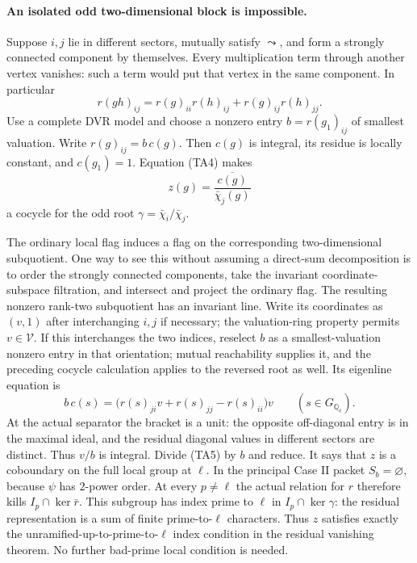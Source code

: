 \paragraph{An isolated odd two-dimensional block is impossible.}
Suppose \(i,j\) lie in different sectors, mutually satisfy
\(\leadsto\), and form a strongly connected component by
themselves. Every multiplication term through another vertex
vanishes: such a term would put that vertex in the same
component. In particular
\[
 r(gh)_{ij}=r(g)_{ii}r(h)_{ij}
                         +r(g)_{ij}r(h)_{jj}.            \tag{TA4}
\]
Use a complete DVR model and choose a nonzero entry
\(b=r(g_1)_{ij}\) of smallest valuation.
Write \(r(g)_{ij}=b\,c(g)\).
Then \(c(g)\) is integral, its residue is locally constant,
and \(c(g_1)=1\).
Equation (TA4) makes
\[
 z(g)=\frac{\overline{c(g)}}{\bar\chi_j(g)}
\]
a cocycle for the odd root
\(\gamma=\bar\chi_i/\bar\chi_j\).

The ordinary local flag induces a flag on the corresponding
two-dimensional subquotient. One way to see this without
assuming a direct-sum decomposition is to order the strongly
connected components, take the invariant coordinate-subspace
filtration, and intersect and project the ordinary flag.
The resulting nonzero rank-two subquotient has an invariant
line. Write its coordinates as \((v,1)\) after interchanging
\(i,j\) if necessary; the valuation-ring property permits
\(v\in\mathcal V\).
If this interchanges the two indices, reselect \(b\) as a
smallest-valuation nonzero entry in that orientation; mutual
reachability supplies it, and the preceding cocycle calculation
applies to the reversed root as well.
Its eigenline equation is
\[
 b\,c(s)=\bigl(r(s)_{ji}v+r(s)_{jj}-r(s)_{ii}\bigr)v
                  \qquad(s\in G_{\mathbb Q_\ell}).        \tag{TA5}
\]
At the actual separator the bracket is a unit: the opposite
off-diagonal entry is in the maximal ideal, and the residual
diagonal values in different sectors are distinct.
Thus \(v/b\) is integral.
Divide (TA5) by \(b\) and reduce. It says that \(z\) is a
coboundary on the full local group at \(\ell\).
In the principal Case II packet \(S_b=\varnothing\), because
\(\psi\) has \(2\)-power order. At every \(p\ne\ell\) the
actual relation for \(r\) therefore kills
\(I_p\cap\ker\bar r\).
This subgroup has index prime to \(\ell\) in
\(I_p\cap\ker\gamma\): the residual representation is a
sum of finite prime-to-\(\ell\) characters.
Thus \(z\) satisfies exactly the unramified-up-to-prime-to-\(\ell\)
index condition in the residual vanishing theorem.
No further bad-prime local condition is needed.

